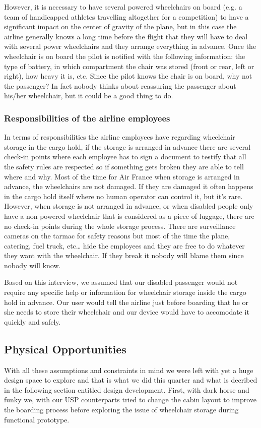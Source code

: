 However, it is necessary to have several powered wheelchairs on board (e.g. a team of handicapped athletes travelling altogether for a competition) to have a significant impact on the center of gravity of the plane, but in this case the airline generally knows a long time before the flight that they will have to deal with several power wheelchairs and they arrange everything in advance.
Once the wheelchair is on board the pilot is notified with the following information: the type of battery, in which compartment the chair was stored (front or rear, left or right), how heavy it is, etc. Since the pilot knows the chair is on board, why not the passenger? In fact nobody thinks about reassuring the passenger about his/her wheelchair, but it could be a good thing to do.

\subsubsection{Responsibilities of the airline employees}
In terms of responsibilities the airline employees have regarding wheelchair storage in the cargo hold, if the storage is arranged in advance there are several check-in points where each employee has to sign a document to testify that all the safety rules are respected so if something gets broken they are able to tell where and why. Most of the time for Air France when storage is arranged in advance, the wheelchairs are not damaged. If they are damaged it often happens in the cargo hold itself where no human operator can control it, but it’s rare. 
However, when storage is not arranged in advance, or when disabled people only have a non powered wheelchair that is considered as a piece of luggage, there are no check-in points during the whole storage process. There are surveillance cameras on the tarmac for safety reasons but most of the time the plane, catering, fuel truck, etc… hide the employees and they are free to do whatever they want with the wheelchair. If they break it nobody will blame them since nobody will know.

Based on this interview, we assumed that our disabled passenger would not require any specific help or information for wheelchair storage inside the cargo hold in advance. Our user would tell the airline just before boarding that he or she needs to store their wheelchair and our device would have to accomodate it quickly and safely.


\subsection{Physical Opportunities}

With all these assumptions and constraints in mind we were left with yet a huge design space to explore and that is what we did this quarter and what is decribed in the following section entitled design development. First, with dark horse and funky we, with our USP counterparts tried to change the cabin layout to improve the boarding process before exploring the issue of wheelchair storage during functional prototype.
